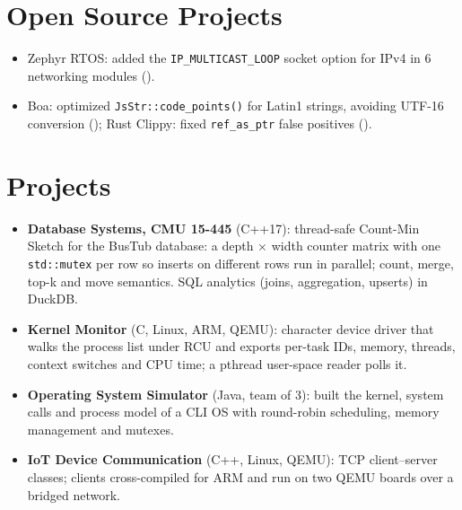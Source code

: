 \documentclass[10pt]{article}
\begin{document}
\section*{Open Source Projects}
\begin{itemize}
  \item Zephyr RTOS: added the \texttt{IP\_MULTICAST\_LOOP} socket option for IPv4 in 6 networking modules ().
  \item Boa: optimized \texttt{JsStr::code\_points()} for Latin1 strings, avoiding UTF-16 conversion (); Rust Clippy: fixed \texttt{ref\_as\_ptr} false positives ().
\end{itemize}

\section*{Projects}
\begin{itemize}
  \item \textbf{Database Systems, CMU 15-445} (C++17): thread-safe Count-Min Sketch for the BusTub database: a depth $\times$ width counter matrix with one \texttt{std::mutex} per row so inserts on different rows run in parallel; count, merge, top-k and move semantics. SQL analytics (joins, aggregation, upserts) in DuckDB. 
  \item \textbf{Kernel Monitor} (C, Linux, ARM, QEMU): character device driver that walks the process list under RCU and exports per-task IDs, memory, threads, context switches and CPU time; a pthread user-space reader polls it. 
  \item \textbf{Operating System Simulator} (Java, team of 3): built the kernel, system calls and process model of a CLI OS with round-robin scheduling, memory management and mutexes. 
  \item \textbf{IoT Device Communication} (C++, Linux, QEMU): TCP client--server classes; clients cross-compiled for ARM and run on two QEMU boards over a bridged network. 
\end{itemize}
\end{document}
